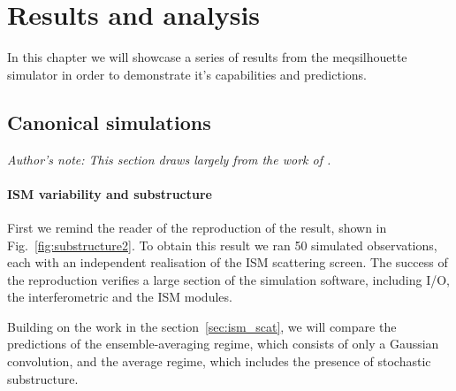 \chapter{Results and analysis}
In this chapter we will showcase a series of results from the {\sc meqsilhouette} simulator in order to demonstrate it's capabilities and predictions.


\section{Canonical simulations}\label{sec:can_sim}
{\it Author's note: This section draws largely from the work of \citet{Blecher_2016}.}

\subsubsection{ISM variability and substructure}
First we remind the reader of the reproduction of the \citet{Ortiz_2016} result, shown in Fig.~\ref{fig:substructure2}. To obtain this result we ran 50 simulated observations, each with an independent realisation of the ISM scattering screen. The success of the reproduction verifies a large section of the simulation software, including I/O, the interferometric and the ISM modules. 


Building on the work in the section~\ref{sec:ism_scat}, we will compare the predictions of the ensemble-averaging regime, which consists of only a Gaussian convolution, and the average regime, which includes the presence of stochastic substructure. 

